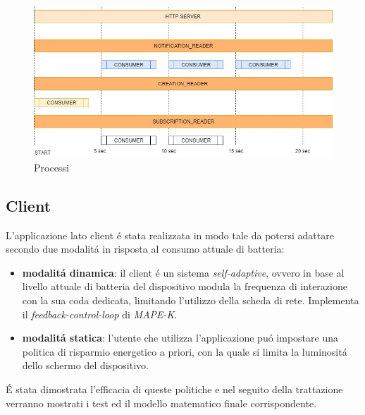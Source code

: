 \documentclass{article}
\begin{document}
\begin{figure}[h]
\begin{center}
\centering
\includegraphics[width=1.1\textwidth]{stableprocess.jpg} %
\caption{Processi}
\label{fig:Processi}
\end{center}
\end{figure}

\subsection{Client}
L'applicazione lato client \'e stata realizzata in modo tale da potersi adattare secondo due modalit\'a in risposta al consumo attuale di batteria:
\begin{itemize}
\item{\textbf{modalit\'a dinamica}: il client \'e un sistema \textit{self-adaptive}, ovvero in base al livello attuale di batteria del dispositivo modula la frequenza di interazione con la sua coda dedicata, limitando l'utilizzo della scheda di rete. Implementa il \textit{feedback-control-loop} di \textit{MAPE-K}. }
\item{\textbf{modalit\'a statica}: l'utente che utilizza l'applicazione pu\'o impostare una politica di risparmio energetico a priori, con la quale si limita la luminosit\'a dello schermo del dispositivo. }
\end{itemize}
\'E stata dimostrata l'efficacia di queste politiche e nel seguito della trattazione verranno mostrati i test ed il modello matematico finale corrispondente.
\end{document}
